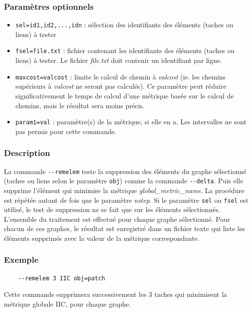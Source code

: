\documentclass[a4paper,10pt]{report}
\begin{document}
\subsubsection{Paramètres optionnels}
\begin{itemize}
	\item \verb|sel=id1,id2,...,idn| : sélection des identifiants des éléments (taches ou liens) à tester
	\item \verb|fsel=file.txt| : fichier contenant les identifiants des éléments (taches ou liens) à tester. Le fichier \textit{file.txt} doit contenir un identifiant par ligne.
	\item \verb|maxcost=valcost| : limite le calcul de chemin à \textit{valcost} (ie. les chemins supérieurs à \textit{valcost} ne seront pas calculés). Ce paramètre peut réduire significativement le temps de calcul d'une métrique basée sur le calcul de chemins, mais le résultat sera moins précis.
	\item \verb|param1=val| : paramètre(s) de la métrique, si elle en a. Les intervalles ne sont pas permis pour cette commande.
\end{itemize}

\subsubsection{Description}
La commande \verb|--remelem| teste la suppression des éléments du graphe sélectionné (taches ou liens selon le paramètre \verb|obj|) comme la commande \verb|--delta|. Puis elle supprime l'élément qui minimise la métrique \textit{global\_metric\_name}. La procédure est répétée autant de fois que le paramètre \textit{nstep}.
Si le paramètre \verb|sel| ou \verb|fsel| est utilisé, le test de suppression ne se fait que sur les éléments sélectionnés.
L'ensemble du traitement est effectué pour chaque graphe sélectionné. Pour chacun de ces graphes, le résultat est enregistré dans un fichier texte qui  liste les éléments supprimés avec la valeur de la métrique correspondante.

\subsubsection{Exemple}

\begin{Verbatim}
	--remelem 3 IIC obj=patch
\end{Verbatim}

Cette commande supprimera successivement les 3 taches qui minimisent la métrique globale IIC, pour chaque graphe.
\end{document}
